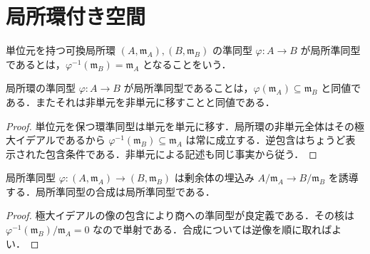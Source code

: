 \section{局所環付き空間}
\begin{defn}[局所環準同型]
単位元を持つ可換局所環 $(A,\mathfrak m_A),(B,\mathfrak m_B)$ の準同型 $\varphi:A\to B$ が局所準同型であるとは，$\varphi^{-1}(\mathfrak m_B)=\mathfrak m_A$ となることをいう．
\end{defn}
\begin{prop}[局所準同型の判定]
局所環の準同型 $\varphi:A\to B$ が局所準同型であることは，$\varphi(\mathfrak m_A)\subseteq\mathfrak m_B$ と同値である．またそれは非単元を非単元に移すことと同値である．
\end{prop}
\begin{proof}
単位元を保つ環準同型は単元を単元に移す．局所環の非単元全体はその極大イデアルであるから $\varphi^{-1}(\mathfrak m_B)\subseteq\mathfrak m_A$ は常に成立する．逆包含はちょうど表示された包含条件である．非単元による記述も同じ事実から従う．
\end{proof}
\begin{prop}[剰余体への誘導写像]
局所準同型 $\varphi:(A,\mathfrak m_A)\to(B,\mathfrak m_B)$ は剰余体の埋込み $A/\mathfrak m_A\to B/\mathfrak m_B$ を誘導する．局所準同型の合成は局所準同型である．
\end{prop}
\begin{proof}
極大イデアルの像の包含により商への準同型が良定義である．その核は $\varphi^{-1}(\mathfrak m_B)/\mathfrak m_A=0$ なので単射である．合成については逆像を順に取ればよい．
\end{proof}
